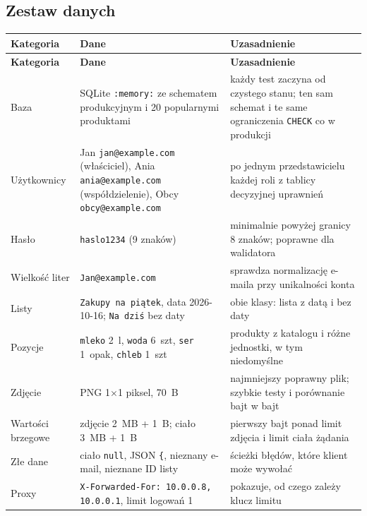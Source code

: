 \documentclass[a4paper,11pt]{article}
\newcommand{\code}[1]{\texttt{\small #1}}
\begin{document}
\subsection{Zestaw danych}
{\small
\begin{xltabular}{\textwidth}{@{}l L L@{}}
\toprule
\textsf{\textbf{Kategoria}} & \textsf{\textbf{Dane}} & \textsf{\textbf{Uzasadnienie}}\\
\midrule
\endfirsthead
\toprule
\textsf{\textbf{Kategoria}} & \textsf{\textbf{Dane}} & \textsf{\textbf{Uzasadnienie}}\\
\midrule
\endhead
\bottomrule
\endfoot
Baza & SQLite \code{:memory:} ze schematem produkcyjnym i 20 popularnymi produktami & każdy test zaczyna od czystego stanu; ten sam schemat i te same ograniczenia \code{CHECK} co w produkcji\\
Użytkownicy & Jan \code{jan@example.com} (właściciel), Ania \code{ania@example.com} (współdzielenie), Obcy \code{obcy@example.com} & po jednym przedstawicielu każdej roli z tablicy decyzyjnej uprawnień\\
Hasło & \code{haslo1234} (9 znaków) & minimalnie powyżej granicy 8 znaków; poprawne dla walidatora\\
Wielkość liter & \code{Jan@example.com} & sprawdza normalizację e-maila przy unikalności konta\\
Listy & \code{Zakupy na piątek}, data 2026-10-16; \code{Na dziś} bez daty & obie klasy: lista z datą i bez daty\\
Pozycje & \code{mleko} 2~l, \code{woda} 6~szt, \code{ser} 1~opak, \code{chleb} 1~szt & produkty z katalogu i różne jednostki, w tym niedomyślne\\
Zdjęcie & PNG 1$\times$1 piksel, 70~B & najmniejszy poprawny plik; szybkie testy i porównanie bajt w bajt\\
Wartości brzegowe & zdjęcie 2~MB + 1~B; ciało 3~MB + 1~B & pierwszy bajt ponad limit zdjęcia i limit ciała żądania\\
Złe dane & ciało \code{null}, JSON \code{\{}, nieznany e-mail, nieznane ID listy & ścieżki błędów, które klient może wywołać\\
Proxy & \code{X-Forwarded-For: 10.0.0.8, 10.0.0.1}, limit logowań 1 & pokazuje, od czego zależy klucz limitu\\
\end{xltabular}
\vspace{-1.2em}}
\end{document}
